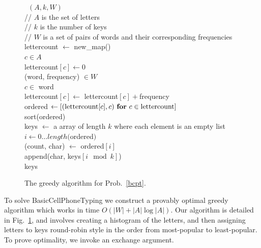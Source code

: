 \documentclass[runningheads]{llncs}
\begin{document}
\begin{figure}
\begin{algorithm}
~$(A, k, W)$\+\\
    // $A$ is the set of letters \\
    // $k$ is the number of keys \\
    // $W$ is a set of pairs of words and their corresponding frequencies \\
    lettercount $\gets$ new\_map() \\
    \For $c \in A$\+\\
        lettercount$[c] \gets 0$\-\\
    \For (word, frequency) $\in W$\+\\
        \For $c \in$ word \+\\
            lettercount$[c] \gets $ lettercount$[c] +$frequency\-\-\\
    ordered $\gets \left[ ({\rm lettercount}[c], c)~\For c \in {\rm lettercount} \right]$\\
    sort(ordered)\\
    keys $\gets$ a array of length $k$ where each element is an empty list\\
    \For $i \gets 0 \ldots length($ordered$)$\+\\
        (count, char) $\gets$ ordered$[i]$\\
        append(char, keys$[i\mod k]$)\-\\
    \Return keys
\end{algorithm}
\caption{The greedy algorithm for Prob.~\ref{bcpt}.}
\label{greedyalg}
\end{figure}

To solve {\sc BasicCellPhoneTyping} we construct a provably optimal
greedy algorithm which works in time $O(|W| + |A| \log |A|)$.  Our algorithm is
detailed in Fig.~\ref{greedyalg}, and involves creating a histogram of the
letters, and then assigning letters to keys round-robin style in the order from
most-popular to least-popular.  To prove optimality, we invoke an exchange argument.
\end{document}
